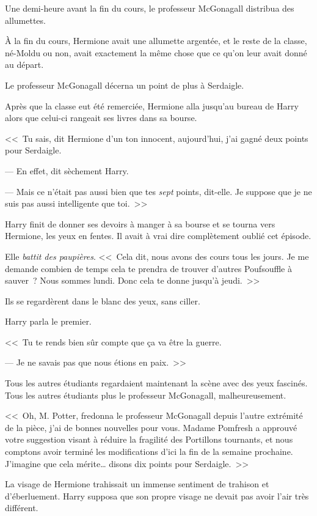 Une demi-heure avant la fin du cours, le professeur McGonagall distribua des allumettes.

À la fin du cours, Hermione avait une allumette argentée, et le reste de la classe, né-Moldu ou non, avait exactement la même chose que ce qu'on leur avait donné au départ.

Le professeur McGonagall décerna un point de plus à Serdaigle.

\later

Après que la classe eut été remerciée, Hermione alla jusqu'au bureau de Harry alors que celui-ci rangeait ses livres dans sa bourse.

<<~Tu sais, dit Hermione d'un ton innocent, aujourd'hui, j'ai gagné deux points pour Serdaigle.

--- En effet, dit sèchement Harry.

--- Mais ce n'était pas aussi bien que tes \emph{sept} points, dit-elle. Je suppose que je ne suis pas aussi intelligente que toi.~>>

Harry finit de donner ses devoirs à manger à sa bourse et se tourna vers Hermione, les yeux en fentes. Il avait à vrai dire complètement oublié cet épisode.

Elle \emph{battit des paupières}. <<~Cela dit, nous avons des cours tous les jours. Je me demande combien de temps cela te prendra de trouver d'autres Poufsouffle à sauver~? Nous sommes lundi. Donc cela te donne jusqu'à jeudi.~>>

Ils se regardèrent dans le blanc des yeux, sans ciller.

Harry parla le premier.

<<~Tu te rends bien sûr compte que ça va être la guerre.

--- Je ne savais pas que nous étions en paix.~>>

Tous les autres étudiants regardaient maintenant la scène avec des yeux fascinés. Tous les autres étudiants plus le professeur McGonagall, malheureusement.

<<~Oh, M. Potter, fredonna le professeur McGonagall depuis l'autre extrémité de la pièce, j'ai de bonnes nouvelles pour vous. Madame Pomfresh a approuvé votre suggestion visant à réduire la fragilité des Portillons tournants, et nous comptons avoir terminé les modifications d'ici la fin de la semaine prochaine. J'imagine que cela mérite… disons dix points pour Serdaigle.~>>

La visage de Hermione trahissait un immense sentiment de trahison et d'éberluement. Harry supposa que son propre visage ne devait pas avoir l'air très différent.


